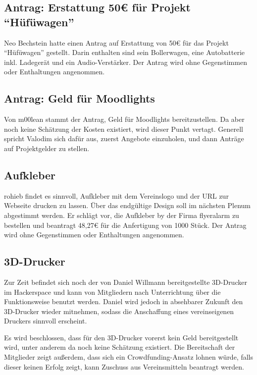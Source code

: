 \documentclass[a4paper,12pt]{scrartcl}
\begin{document}
\subsection{Antrag: Erstattung 50€ für Projekt "`Hüfüwagen"'}
Neo Bechstein hatte einen Antrag auf Erstattung von 50€ für das Projekt
"`Hüfüwagen"' gestellt. Darin enthalten sind sein Bollerwagen, eine
Autobatterie inkl. Ladegerät und ein Audio-Verstärker. Der Antrag wird ohne
Gegenstimmen oder Enthaltungen angenommen.

\subsection{Antrag: Geld für Moodlights}
\postponed
Von m00lean stammt der Antrag, Geld für Moodlights bereitzustellen. Da aber noch
keine Schätzung der Kosten existiert, wird dieser Punkt vertagt. Generell
spricht Valodim sich dafür aus, zuerst Angebote einzuholen, und dann Anträge auf
Projektgelder zu stellen.

\subsection{Aufkleber}
rohieb findet es sinnvoll, Aufkleber mit dem Vereinslogo und der URL zur
Webseite drucken zu lassen. Über das endgültige Design soll im nächsten Plenum
abgestimmt werden. Er schlägt vor, die Aufkleber by der Firma flyeralarm zu
bestellen und beantragt 48{,}27€ für die Anfertigung von 1000 Stück. Der
Antrag wird ohne Gegenstimmen oder Enthaltungen angenommen.

\subsection{3D-Drucker}
Zur Zeit befindet sich noch der von Daniel Willmann bereitgestellte 3D-Drucker
im Hackerspace und kann von Mitgliedern nach Unterrichtung über die
Funktionsweise benutzt werden. Daniel wird jedoch in absehbarer Zukunft den
3D-Drucker wieder mitnehmen, sodass die Anschaffung eines vereinseigenen
Druckers sinnvoll erscheint.

Es wird beschlossen, dass für den 3D-Drucker vorerst kein Geld bereitgestellt
wird, unter anderem da noch keine Schätzung existiert. Die Bereitschaft der
Mitglieder zeigt außerdem, dass sich ein Crowdfunding-Ansatz lohnen würde, falls
dieser keinen Erfolg zeigt, kann Zuschuss aus Vereinsmitteln beantragt werden.
\end{document}
